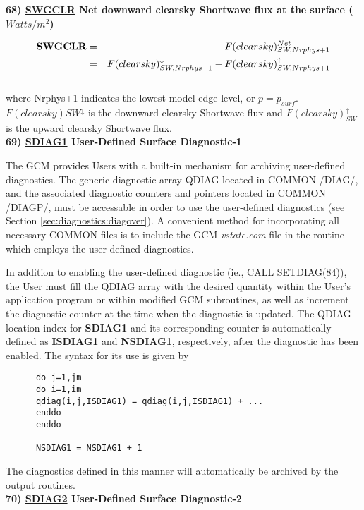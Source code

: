 \noindent
{\bf 68)  \underline {SWGCLR} Net downward clearsky Shortwave flux at the surface ($Watts/m^2$) }

\noindent
\begin{eqnarray*}
{\bf SWGCLR} & =  & F(clearsky)_{SW,Nrphys+1}^{Net} \\
             & =  & F(clearsky)_{SW,Nrphys+1}^\downarrow - F(clearsky)_{SW,Nrphys+1}^\uparrow
\end{eqnarray*}
\noindent
\\
where Nrphys+1 indicates the lowest model edge-level, or $p = p_{surf}$.
$F(clearsky){SW}^\downarrow$ is
the downward clearsky Shortwave flux and $F(clearsky)_{SW}^\uparrow$ is 
the upward clearsky Shortwave flux.
\\

\noindent
{\bf 69)  \underline {SDIAG1} User-Defined Surface Diagnostic-1 }

\noindent
The GCM provides Users with a built-in mechanism for archiving user-defined
diagnostics.  The generic diagnostic array QDIAG located in COMMON /DIAG/, and the associated 
diagnostic counters and pointers located in COMMON /DIAGP/,
must be accessable in order to use the user-defined diagnostics (see Section \ref{sec:diagnostics:diagover}).  
A convenient method for incorporating all necessary COMMON files is to
include the GCM {\em vstate.com} file in the routine which employs the
user-defined diagnostics.

\noindent
In addition to enabling the user-defined diagnostic (ie., CALL SETDIAG(84)), the User must fill 
the QDIAG array with the desired quantity within the User's
application program or within modified GCM subroutines, as well as increment
the diagnostic counter at the time when the diagnostic is updated.  
The QDIAG location index for {\bf SDIAG1} and its corresponding counter is 
automatically defined as {\bf ISDIAG1} and {\bf NSDIAG1}, respectively, after the 
diagnostic has been enabled.  
The syntax for its use is given by
\begin{verbatim}
      do j=1,jm
      do i=1,im
      qdiag(i,j,ISDIAG1) = qdiag(i,j,ISDIAG1) + ...
      enddo
      enddo

      NSDIAG1 = NSDIAG1 + 1
\end{verbatim}
The diagnostics defined in this manner will automatically be archived by the output routines.
\\

\noindent
{\bf 70)  \underline {SDIAG2} User-Defined Surface Diagnostic-2 }


